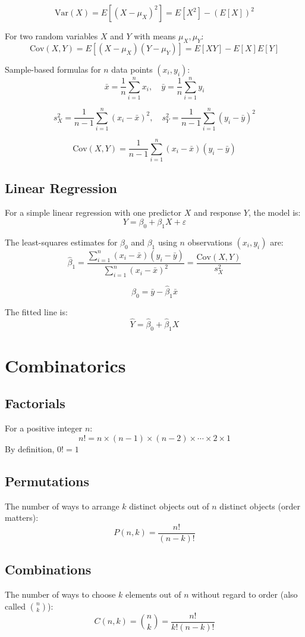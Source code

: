 \documentclass{article}
\begin{document}
\begin{multicols}{2}
\[
\text{Var}(X) = E[(X - \mu_X)^2] = E[X^2] - (E[X])^2
\]

For two random variables \(X\) and \(Y\) with means \(\mu_X, \mu_Y\):
\[
\text{Cov}(X,Y) = E[(X - \mu_X)(Y - \mu_Y)] = E[XY] - E[X]E[Y]
\]

Sample-based formulas for \(n\) data points \((x_i, y_i)\):
\[
\bar{x} = \frac{1}{n}\sum_{i=1}^n x_i, \quad \bar{y} = \frac{1}{n}\sum_{i=1}^n y_i
\]

\[
s_X^2 = \frac{1}{n-1}\sum_{i=1}^n (x_i - \bar{x})^2, \quad
s_Y^2 = \frac{1}{n-1}\sum_{i=1}^n (y_i - \bar{y})^2
\]

\[
\text{Cov}(X,Y) = \frac{1}{n-1}\sum_{i=1}^n (x_i - \bar{x})(y_i - \bar{y})
\]

\subsection*{Linear Regression}
For a simple linear regression with one predictor \( X \) and response \( Y \), the model is:
\[
Y = \beta_0 + \beta_1 X + \varepsilon
\]

The least-squares estimates for \(\beta_0\) and \(\beta_1\) using \(n\) observations \((x_i, y_i)\) are:
\[
\hat{\beta}_1 = \frac{\sum_{i=1}^n (x_i - \bar{x})(y_i - \bar{y})}{\sum_{i=1}^n (x_i - \bar{x})^2} = \frac{\text{Cov}(X,Y)}{s_X^2}
\]

\[
\hat{\beta}_0 = \bar{y} - \hat{\beta}_1 \bar{x}
\]

The fitted line is:
\[
\hat{Y} = \hat{\beta}_0 + \hat{\beta}_1 X
\]

\section*{Combinatorics}

\subsection*{Factorials}
For a positive integer \(n\):
\[
n! = n \times (n-1) \times (n-2) \times \cdots \times 2 \times 1
\]
By definition, \(0! = 1\)

\subsection*{Permutations}
The number of ways to arrange \(k\) distinct objects out of \(n\) distinct objects (order matters):
\[
P(n, k) = \frac{n!}{(n-k)!}
\]

\subsection*{Combinations}
The number of ways to choose \(k\) elements out of \(n\) without regard to order (also called \(\binom{n}{k}\)):
\[
C(n, k) = \binom{n}{k} = \frac{n!}{k!(n-k)!}
\]


\end{multicols}
\end{document}
